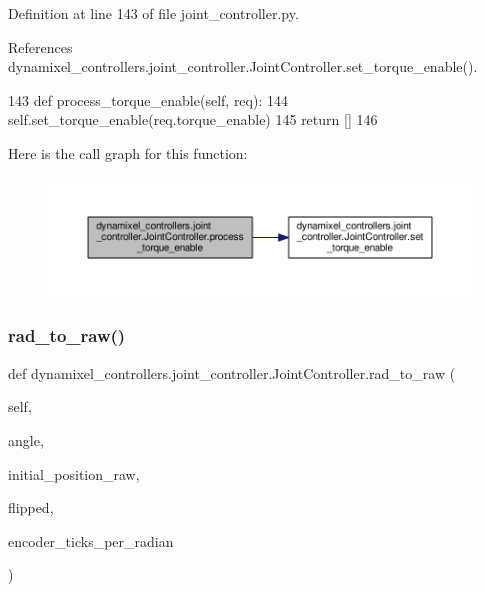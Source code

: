Definition at line 143 of file joint\+\_\+controller.\+py.



References dynamixel\+\_\+controllers.\+joint\+\_\+controller.\+Joint\+Controller.\+set\+\_\+torque\+\_\+enable().


\begin{DoxyCode}
143     \textcolor{keyword}{def }process\_torque\_enable(self, req):
144         self.set\_torque\_enable(req.torque\_enable)
145         \textcolor{keywordflow}{return} []
146 
\end{DoxyCode}
Here is the call graph for this function\+:
\nopagebreak
\begin{figure}[H]
\begin{center}
\leavevmode
\includegraphics[width=350pt]{d3/dcd/classdynamixel__controllers_1_1joint__controller_1_1_joint_controller_a2181fcf467234ed09e378a93ea5a0553_cgraph}
\end{center}
\end{figure}
\mbox{\label{classdynamixel__controllers_1_1joint__controller_1_1_joint_controller_aea21e76e178029b31cd40b3e0335b621}} 
\subsubsection{\texorpdfstring{rad\+\_\+to\+\_\+raw()}{rad\_to\_raw()}}
{\footnotesize\ttfamily def dynamixel\+\_\+controllers.\+joint\+\_\+controller.\+Joint\+Controller.\+rad\+\_\+to\+\_\+raw (\begin{DoxyParamCaption}\item[{}]{self,  }\item[{}]{angle,  }\item[{}]{initial\+\_\+position\+\_\+raw,  }\item[{}]{flipped,  }\item[{}]{encoder\+\_\+ticks\+\_\+per\+\_\+radian }\end{DoxyParamCaption})}

